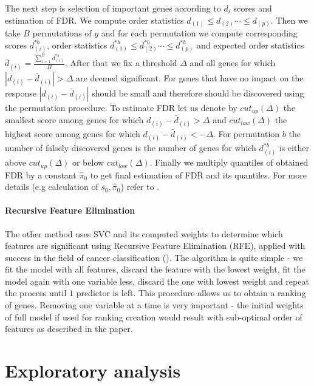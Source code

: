 \documentclass[shortabstract, english, mgr]{iithesis}
\begin{document}
The next step is selection of important genes according to $d_i$ scores and estimation of FDR. We compute order statistics $d_{(1)} \leq d_{(2)} \cdots \leq d_{(p)}$. Then we take $B$ permutations of $y$ and for each permutation we compute corresponding scores $d_{(i)}^{* b}$, order statistics $d_{(1)}^{* b} \leq d_{(2)}^{* b} \cdots \leq d_{(p)}^{* b}$ and expected order statistics $\bar{d}_{(i)}=\frac{\sum_{i=1}^B d_{(i)}^{* b}}{B}$. After that we fix a threshold $\Delta$ and all genes for which $|d_{(i)}-\bar{d}_{(i)}| > \Delta$ are deemed significant. For genes that have no impact on the response $|d_{(i)}-\bar{d}_{(i)}|$ should be small and therefore should be discovered using the permutation procedure. To estimate FDR let us denote by $cut_{up}(\Delta)$ the smallest score among genes for which $d_{(i)}-\bar{d}_{(i)} > \Delta$ and $cut_{low}(\Delta)$ the highest score among genes for which $d_{(i)}-\bar{d}_{(i)} < -\Delta$. For permutation $b$ the number of falsely discovered genes is the number of genes for which $d_{(i)}^{*b}$ is either above $cut_{up}(\Delta)$ or below $cut_{low}(\Delta)$. Finally we multiply quantiles of obtained FDR by a constant $\hat{\pi}_0$ to get final estimation of FDR and its quantiles. For more details (e.g calculation of $s_0, \hat{\pi}_0$) refer to \cite{SAM}. 

\subsubsection{Recursive Feature Elimination}

The other method uses SVC and its computed weights to determine which features are significant using Recursive Feature Elimination (RFE), applied with success in the field of cancer classification (\cite{SVMRFE}). The algorithm is quite simple - we fit the model with all features, discard the feature with the lowest weight, fit the model again with one variable less, discard the one with lowest weight and repeat the process until $1$ predictor is left. This procedure allows us to obtain a ranking of genes. Removing one variable at a time is very important - the initial weights of full model if used for ranking creation would result with sub-optimal order of features as described in the paper.

\chapter{Exploratory analysis} \label{section:exploratory}
\end{document}

